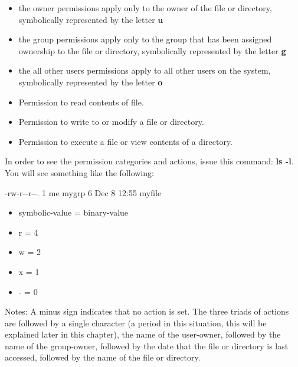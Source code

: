 \begin{itemize}
	\item {}the owner permissions apply only to the owner of the file or directory, symbolically represented by the letter \textbf{u}
	\item {}the group permissions apply only to the group that has been assigned ownership to the file or directory, symbolically represented by the letter \textbf{g}
	\item {}the all other users permissions apply to all other users on the system, symbolically represented by the letter \textbf{o}
\end{itemize}

\begin{itemize}
	\item {}Permission to read contents of file.
	\item {}Permission to write to or modify a file or directory.
	\item {}Permission to execute a file or view contents of a directory.
\end{itemize}

In order to see the permission categories and actions, issue this command: \textbf{ls -l}. You will see something like the following:

-rw-r-{}-{}r-{}-{}. 1 me mygrp    6 Dec  8 12:55 myfile\\

\begin{itemize}
	\item {} symbolic-value = binary-value
	\item {}r = 4
	\item {}w = 2
	\item {}x = 1
	\item {} - = 0
\end{itemize}

Notes: A minus sign indicates that no action is set. The three triads of actions are followed by a single character (a period in this situation, this will be explained later in this chapter), the name of the user-owner, followed by the name of the group-owner, followed by the date that the file or directory is last accessed, followed by the name of the file or directory.

